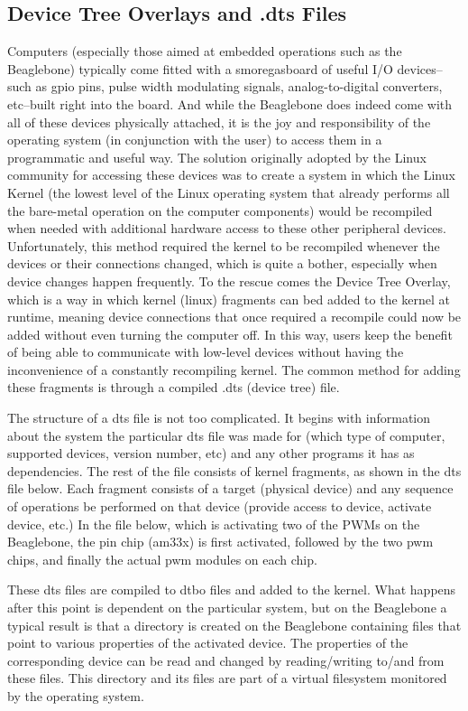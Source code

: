 \documentclass{article}
\let\Oldsubsection\subsection
\renewcommand{\subsection}{\FloatBarrier\Oldsubsection}
\begin{document}
\subsection{Device Tree Overlays and .dts Files}
	Computers (especially those aimed at embedded operations such as the Beaglebone) typically come fitted with a smoregasboard of useful I/O devices--such as gpio pins, pulse width modulating signals, analog-to-digital converters, etc--built right into the board. And while the Beaglebone does indeed come with all of these devices physically attached, it is the joy and responsibility of the operating system (in conjunction with the user) to access them in a programmatic and useful way. The solution originally adopted by the Linux community for accessing these devices was to create a system in which the Linux Kernel (the lowest level of the Linux operating system that already performs all the bare-metal operation on the computer components) would be recompiled when needed with additional hardware access to these other peripheral devices. Unfortunately, this method required the kernel to be recompiled whenever the devices or their connections changed, which is quite a bother, especially when device changes happen frequently. To the rescue comes the Device Tree Overlay, which is a way in which kernel (linux) fragments can bed added to the kernel at runtime, meaning device connections that once required a recompile could now be added without even turning the computer off. In this way, users keep the benefit of being able to communicate with low-level devices without having the inconvenience of a constantly recompiling kernel. The common method for adding these fragments is through a compiled .dts (device tree) file. 
	
	The structure of a dts file is not too complicated. It begins with information about the system the particular dts file was made for (which type of computer, supported devices, version number, etc) and any other programs it has as dependencies. The rest of the file consists of kernel fragments, as shown in the dts file below. Each fragment consists of a target (physical device) and any sequence of operations be performed on that device (provide access to device, activate device, etc.) In the file below, which is activating two of the PWMs on the Beaglebone, the pin chip (am33x) is first activated, followed by the two pwm chips, and finally the actual pwm modules on each chip. 
	
	These dts files are compiled to dtbo files and added to the kernel. What happens after this point is dependent on the particular system, but on the Beaglebone a typical result is that a directory is created on the Beaglebone containing files that point to various properties of the activated device. The properties of the corresponding device can be read and changed by reading/writing to/and from these files. This directory and its files are part of a virtual filesystem monitored by the operating system. 
	\clearpage
	
\clearpage
\end{document}

